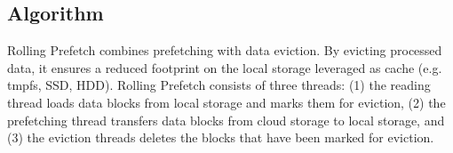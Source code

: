 \subsection{Algorithm}



Rolling Prefetch combines prefetching with data eviction. By evicting processed data, it ensures a reduced footprint on the local storage leveraged as cache
(e.g. tmpfs, SSD, HDD). Rolling Prefetch consists of three threads: (1) the reading thread loads data blocks from local storage and marks them for eviction, (2) the prefetching thread transfers data blocks from cloud storage to local storage, and (3) the eviction threads deletes the blocks that have been marked for eviction.
    
    
    
        
        
